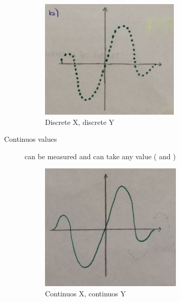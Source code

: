 \begin{description}
		\begin{figure}[!h]
			\centering
			\includegraphics[width=0.7\linewidth]{images_LA/discreteY_discreteX}
			\caption[Discrete X, discrete Y]{Discrete X, discrete Y}
			\label{fig:discreteY_discreteX}
		\end{figure}

	\item[Continuos values] can be measured and can take any value ( and )
		\begin{figure}[!h]
			\centering
			\includegraphics[width=0.7\linewidth]{images_LA/ContinuosX_continuosY}
			\caption{Continuos X, continuos Y}
			\label{fig:ContinuosX_continuosY}
		\end{figure}
		

\end{description}
